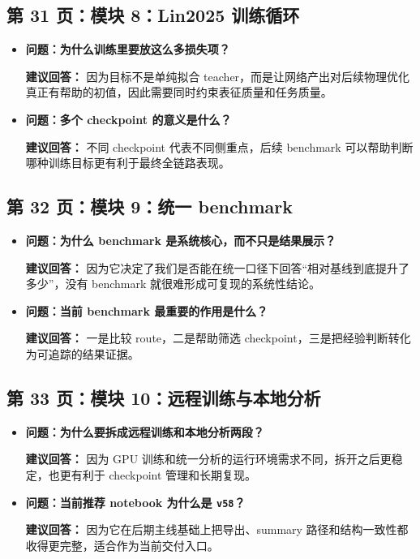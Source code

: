 \documentclass[12pt,a4paper]{ctexart}
\begin{document}
\subsection{第 31 页：模块 8：Lin2025 训练循环}
\begin{itemize}
\item \textbf{问题：为什么训练里要放这么多损失项？}

\textbf{建议回答：} 因为目标不是单纯拟合 teacher，而是让网络产出对后续物理优化真正有帮助的初值，因此需要同时约束表征质量和任务质量。

\item \textbf{问题：多个 checkpoint 的意义是什么？}

\textbf{建议回答：} 不同 checkpoint 代表不同侧重点，后续 benchmark 可以帮助判断哪种训练目标更有利于最终全链路表现。
\end{itemize}

\subsection{第 32 页：模块 9：统一 benchmark}
\begin{itemize}
\item \textbf{问题：为什么 benchmark 是系统核心，而不只是结果展示？}

\textbf{建议回答：} 因为它决定了我们是否能在统一口径下回答“相对基线到底提升了多少”，没有 benchmark 就很难形成可复现的系统性结论。

\item \textbf{问题：当前 benchmark 最重要的作用是什么？}

\textbf{建议回答：} 一是比较 route，二是帮助筛选 checkpoint，三是把经验判断转化为可追踪的结果证据。
\end{itemize}

\subsection{第 33 页：模块 10：远程训练与本地分析}
\begin{itemize}
\item \textbf{问题：为什么要拆成远程训练和本地分析两段？}

\textbf{建议回答：} 因为 GPU 训练和统一分析的运行环境需求不同，拆开之后更稳定，也更有利于 checkpoint 管理和长期复现。

\item \textbf{问题：当前推荐 notebook 为什么是 \texttt{v58}？}

\textbf{建议回答：} 因为它在后期主线基础上把导出、summary 路径和结构一致性都收得更完整，适合作为当前交付入口。
\end{itemize}
\end{document}
